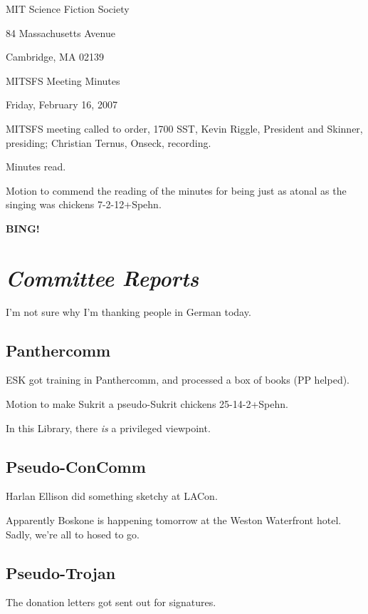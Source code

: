 \documentclass[10pt]{article}
\newcommand{\bing}{{\bf BING!} }
\newcommand{\goto}[1]{\bing \vskip 12pt \section*{{\em{#1}}}}
\begin{document}
\begin{center}

MIT Science Fiction Society

84 Massachusetts Avenue

Cambridge, MA 02139

\vspace{12pt}

MITSFS Meeting Minutes

Friday, February 16, 2007

\end{center}

\vspace{18pt}

\setlength{\parskip}{6pt}

\noindent
MITSFS meeting called to order, 1700 SST,
Kevin Riggle, President and Skinner, presiding; Christian Ternus, Onseck, recording.

Minutes read.

Motion to commend the reading of the minutes for being just as atonal as the singing was chickens 7-2-12+Spehn.

\goto{Committee Reports}

I'm not sure why I'm thanking people in German today.

\subsection*{Panthercomm}

ESK got training in Panthercomm, and processed a box of books (PP helped).

Motion to make Sukrit a pseudo-Sukrit chickens 25-14-2+Spehn.

In this Library, there \emph{is} a privileged viewpoint.

\subsection*{Pseudo-ConComm}

Harlan Ellison did something sketchy at LACon.

Apparently Boskone is happening tomorrow at the Weston Waterfront hotel.  Sadly, we're all to hosed to go.

\subsection*{Pseudo-Trojan}

The donation letters got sent out for signatures.
\end{document}
